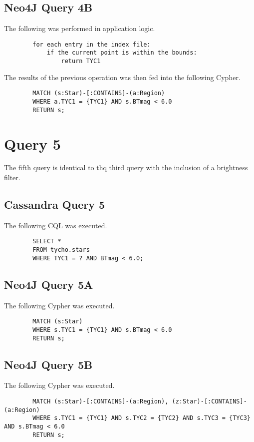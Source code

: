 \documentclass[11pt]{article}
\begin{document}
    \subsection{Neo4J Query 4B}\label{subsec:neo4jQuery4b}
    The following was performed in application logic.
    \begin{lstlisting}
        for each entry in the index file:
            if the current point is within the bounds:
                return TYC1
    \end{lstlisting}

    The results of the previous operation was then fed into the following Cypher.
    \begin{lstlisting}
        MATCH (s:Star)-[:CONTAINS]-(a:Region)
        WHERE a.TYC1 = {TYC1} AND s.BTmag < 6.0
        RETURN s;
    \end{lstlisting}

    \section{Query 5}\label{sec:query5}
    The fifth query is identical to thq third query with the inclusion of a brightness filter.

    \subsection{Cassandra Query 5}\label{subsec:cassandraQuery5}
    The following CQL was executed.
    \begin{lstlisting}
        SELECT *
        FROM tycho.stars
        WHERE TYC1 = ? AND BTmag < 6.0;
    \end{lstlisting}

    \subsection{Neo4J Query 5A}\label{subsec:neo4jQuery5a}
    The following Cypher was executed.
    \begin{lstlisting}
        MATCH (s:Star)
        WHERE s.TYC1 = {TYC1} AND s.BTmag < 6.0
        RETURN s;
    \end{lstlisting}

    \subsection{Neo4J Query 5B}\label{subsec:neo4jQuery5b}
    The following Cypher was executed.
    \begin{lstlisting}
        MATCH (s:Star)-[:CONTAINS]-(a:Region), (z:Star)-[:CONTAINS]-(a:Region)
        WHERE s.TYC1 = {TYC1} AND s.TYC2 = {TYC2} AND s.TYC3 = {TYC3} AND s.BTmag < 6.0
        RETURN s;
    \end{lstlisting}
\end{document}
